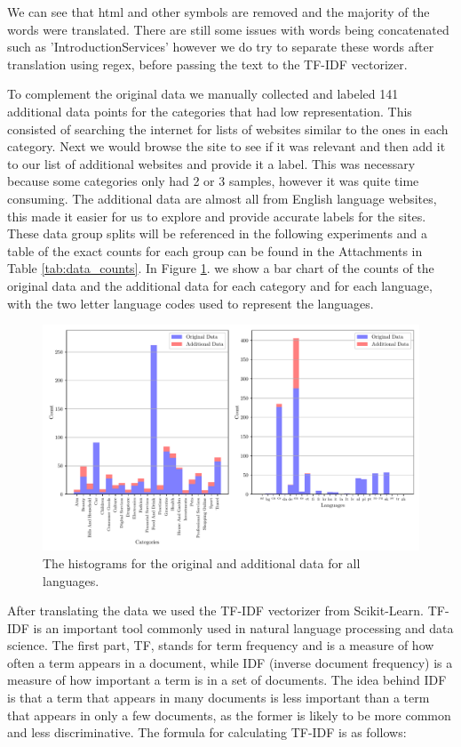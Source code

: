 We can see that html and other symbols are removed and the majority of the words were translated. There are still some issues with words being concatenated such as 'IntroductionServices' however we do try to separate these words after translation using regex, before passing the text to the TF-IDF vectorizer.

To complement the original data we manually collected and labeled 141 additional data points for the categories that had low representation. This consisted of searching the internet for lists of websites similar to the ones in each category. Next we would browse the site to see if it was relevant and then add it to our list of additional websites and provide it a label. This was necessary because some categories only had 2 or 3 samples, however it was quite time consuming. The additional data are almost all from English language websites, this made it easier for us to explore and provide accurate labels for the sites. These data group splits will be referenced in the following experiments and a table of the exact counts for each group can be found in the Attachments in Table \ref{tab:data_counts}. In Figure \ref{fig:all_hist}. we show a bar chart of the counts of the original data and the additional data for each category and for each language, with the two letter language codes used to represent the languages.

\begin{figure}[!ht]
  \centering
  \includegraphics[width=\textwidth]{../img/plot_all_hist.pdf}
  \caption{The histograms for the original and additional data for all languages.}
  \label{fig:all_hist}
\end{figure}

After translating the data we used the TF-IDF vectorizer from Scikit-Learn. TF-IDF is an important tool commonly used in natural language processing and data science. The first part, TF, stands for term frequency and is a measure of how often a term appears in a document, while IDF (inverse document frequency) is a measure of how important a term is in a set of documents. The idea behind IDF is that a term that appears in many documents is less important than a term that appears in only a few documents, as the former is likely to be more common and less discriminative. The formula for calculating TF-IDF is as follows:

